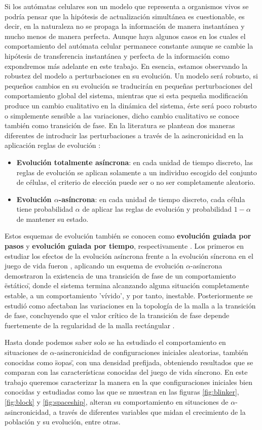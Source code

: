 \documentclass[../proyecto.tex]{book}
\begin{document}
Si los autómatas celulares son un modelo que representa a organismos vivos se podría pensar que la hipótesis de actualización simultánea es cuestionable, es decir, en la naturaleza no se propaga la información de manera instantánea y mucho menos de manera perfecta. Aunque haya algunos casos en los cuales el comportamiento del autómata celular permanece constante aunque se cambie la hipótesis de transferencia instantánea y perfecta de la información como expondremos más adelante en este trabajo. En esencia, estamos observando la robustez del modelo a perturbaciones en su evolución. Un modelo será robusto, si pequeños cambios en su evolución se traducirán en pequeñas perturbaciones del comportamiento global del sistema, mientras que si esta pequeña modificación produce un cambio cualitativo en la dinámica del sistema, éste será poco robusto o simplemente sensible a las variaciones, dicho cambio cualitativo se conoce también como transición de fase. En la literatura se plantean dos maneras diferentes de introducir las perturbaciones a través de la asincronicidad en la aplicación reglas de evolución \cite{asyncIntro}:
\begin{itemize}
	\item \textbf{Evolución totalmente asíncrona}: en cada unidad de tiempo discreto, las reglas de evolución se aplican solamente a un individuo escogido del conjunto de células, el criterio de elección puede ser o no ser completamente aleatorio.
	\item \textbf{Evolución $\alpha$-asíncrona}: en cada unidad de tiempo discreto, cada célula tiene probabilidad $\alpha$ de aplicar las reglas de evolución y probabilidad $1-\alpha$ de mantener su estado.
\end{itemize}

Estos esquemas de evolución también se conocen como \textbf{evolución guiada por pasos} y \textbf{evolución guiada por tiempo}, respectivamente \cite{aka}. Los primeros en estudiar los efectos de la evolución asíncrona frente a la evolución síncrona en el juego de vida fueron \cite{syncVSasync}, aplicando un esquema de evolución $\alpha$-asíncrona demostraron la existencia de una transición de fase de un comportamiento \"estático\", donde el sistema termina alcanzando alguna situación completamente estable, a un comportamiento 'vívido', y por tanto, inestable. Posteriormente se estudió como afectaban las variaciones en la topología de la malla a la transición de fase, concluyendo que el valor crítico de la transición de fase depende fuertemente de la regularidad de la malla rectángular \cite{mallaIrregular1, mallaIrregular2}.

Hasta donde podemos saber solo se ha estudiado el comportamiento en situaciones de $\alpha$-asincronicidad de configuraciones iniciales aleatorias, también conocidas como \"sopas\", con una densidad prefijada, obteniendo resultados que se comparan con las características conocidas del juego de vida síncrono. En este trabajo queremos caracterizar la manera en la que configuraciones iniciales bien conocidas y estudiadas como las que se muestran en las figuras \ref{fig:blinker}, \ref{fig:block} y \ref{fig:spaceship}, alteran su comportamiento en situaciones de $\alpha$-asincronicidad, a través de diferentes variables que midan el crecimiento de la población y su evolución, entre otras.
\end{document}
